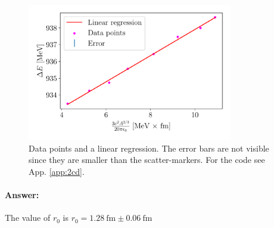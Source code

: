 \begin{figure}[ht]
    \centering
    \includegraphics[width=0.8\textwidth]{figures/r0.pdf}
    \caption{Data points and a linear regression. The error bars are not visible since they are smaller than the scatter-markers. For the code see App. \ref{app:2cd}.}
    \label{fig:r0}
\end{figure}

\paragraph{Answer:} The value of $r_0$ is $r_0 = \SI{1.28}{\femto\m} \pm \SI{0.06}{\femto\m}$
